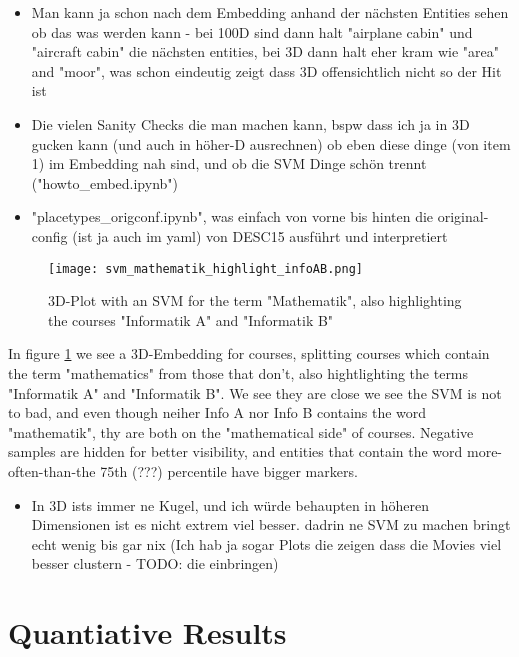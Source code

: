 \begin{itemize}
	\item  Man kann ja schon nach dem Embedding anhand der nächsten Entities sehen ob das was werden kann - bei 100D sind dann halt "airplane cabin" und "aircraft cabin" die nächsten entities, bei 3D dann halt eher kram wie "area" and "moor", was schon eindeutig zeigt dass 3D offensichtlich nicht so der Hit ist
	\item Die vielen Sanity Checks die man machen kann, bspw dass ich ja in 3D gucken kann (und auch in höher-D ausrechnen) ob eben diese dinge (von item 1) im Embedding nah sind, und ob die SVM Dinge schön trennt ("howto_embed.ipynb")
	\item "placetypes_origconf.ipynb", was einfach von vorne bis hinten die original-config (ist ja auch im yaml) von DESC15 ausführt und interpretiert	
\end{itemize}

\begin{figure}[H]
	\centering
	\texttt{[image: svm\_mathematik\_highlight\_infoAB.png]}
	\caption[3D-Plot with an SVM for the term "Mathematik"]{
		\label{fig:3dplot_mathe_infoab}
		3D-Plot with an SVM for the term "Mathematik", also highlighting the courses "Informatik A" and "Informatik B"
	}
\end{figure}

In figure \ref{fig:3dplot_mathe_infoab} we see a 3D-Embedding for courses, splitting courses which contain the term "mathematics" from those that don't, also hightlighting the terms "Informatik A" and "Informatik B". We see they are close we see the SVM is not to bad, and even though neiher Info A nor Info B contains the word "mathematik", thy are both on the "mathematical side" of courses. Negative samples are hidden for better visibility, and entities that contain the word more-often-than-the 75th (???) percentile have bigger markers.


\begin{itemize}
	\item In 3D ists immer ne Kugel, und ich würde behaupten in höheren Dimensionen ist es nicht extrem viel besser. dadrin ne SVM zu machen bringt echt wenig bis gar nix (Ich hab ja sogar Plots die zeigen dass die Movies viel besser clustern - TODO: die einbringen)
\end{itemize}


\section{Quantiative Results}

